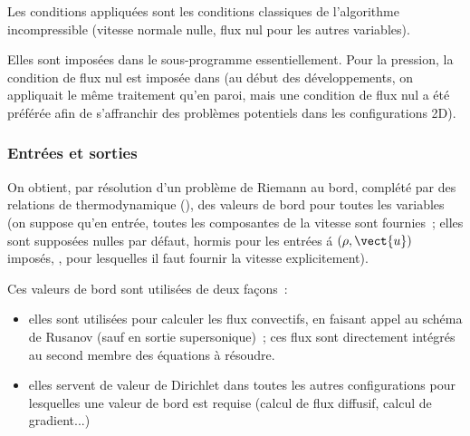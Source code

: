 Les conditions appliqu\'ees sont les conditions classiques de l'algorithme
incompressible (vitesse normale nulle, flux nul pour les autres variables).

Elles sont impos\'ees dans le sous-programme  essentiellement. Pour
la pression, la condition de flux nul est impos\'ee dans 
(au d\'ebut des d\'eveloppements, on appliquait le m\^eme traitement qu'en paroi,
mais une condition de flux nul a \'et\'e pr\'ef\'er\'ee afin de s'affranchir des
probl\`emes potentiels dans les configurations 2D).


\subsubsection*{Entr\'ees et sorties}

On obtient, par r\'esolution d'un probl\`eme de Riemann au bord, compl\'et\'e par
des relations de thermodynamique (), des valeurs de bord pour toutes
les variables (on suppose qu'en entr\'ee, toutes les composantes de la vitesse
sont fournies~; elles sont suppos\'ees nulles par d\'efaut, hormis pour les
entr\'ees \'a $(\rho,\vect{u})$ impos\'es, , pour lesquelles il faut
fournir la vitesse explicitement).

Ces valeurs de bord sont utilis\'ees de deux fa\c cons~:
\begin{itemize}
\item elles sont utilis\'ees pour calculer les flux convectifs, en faisant
appel au sch\'ema de Rusanov (sauf en sortie supersonique)~; ces flux sont
directement int\'egr\'es au second membre des \'equations \`a r\'esoudre.
\item elles servent de valeur de Dirichlet dans toutes les autres configurations
pour lesquelles une valeur de bord est requise (calcul de flux diffusif,
calcul de gradient...)
\end{itemize}


